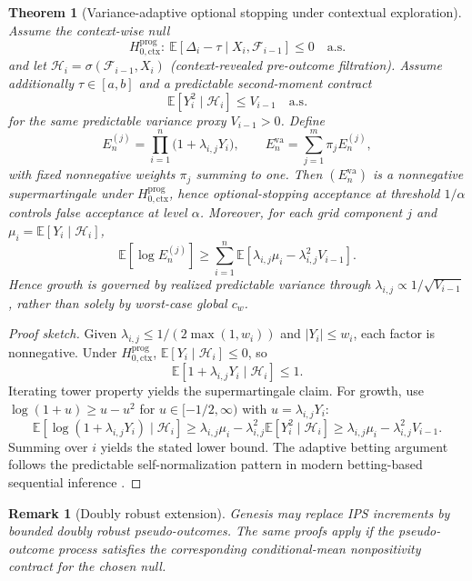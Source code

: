 \documentclass[11pt,a4paper]{article}
\newtheorem{theorem}{Theorem}[section]
\newtheorem{remark}{Remark}[section]
\begin{document}
\begin{theorem}[Variance-adaptive optional stopping under contextual exploration]
\label{thm:adaptive-var}
Assume the context-wise null
\[
H_{0,\mathrm{ctx}}^{\mathrm{prog}}:\ \mathbb{E}[\Delta_i-\tau\mid X_i,\mathcal{F}_{i-1}]\le 0\quad\text{a.s.}
\]
and let $\mathcal{H}_i=\sigma(\mathcal{F}_{i-1},X_i)$ (context-revealed pre-outcome filtration).
Assume additionally $\tau\in[a,b]$ and a predictable second-moment contract
\[
\mathbb{E}[Y_i^2\mid \mathcal{H}_i]\le V_{i-1}\quad\text{a.s.}
\]
for the same predictable variance proxy $V_{i-1}>0$.
Define
\[
E_n^{(j)}=\prod_{i=1}^{n}\bigl(1+\lambda_{i,j}Y_i\bigr),\qquad
E_n^{\mathrm{va}}=\sum_{j=1}^{m}\pi_j E_n^{(j)},
\]
with fixed nonnegative weights $\pi_j$ summing to one.
Then $(E_n^{\mathrm{va}})$ is a nonnegative supermartingale under $H_{0,\mathrm{ctx}}^{\mathrm{prog}}$, hence optional-stopping acceptance at threshold $1/\alpha$ controls false acceptance at level $\alpha$.
Moreover, for each grid component $j$ and $\mu_i=\mathbb{E}[Y_i\mid\mathcal{H}_i]$,
\[
\mathbb{E}\!\left[\log E_n^{(j)}\right]
\ge
\sum_{i=1}^{n}\mathbb{E}\!\left[\lambda_{i,j}\mu_i-\lambda_{i,j}^2V_{i-1}\right].
\]
Hence growth is governed by realized predictable variance through $\lambda_{i,j}\propto 1/\sqrt{V_{i-1}}$, rather than solely by worst-case global $c_w$.
\end{theorem}
\begin{proof}[Proof sketch]
Given $\lambda_{i,j}\le 1/(2\max(1,w_i))$ and $|Y_i|\le w_i$, each factor is nonnegative.
Under $H_{0,\mathrm{ctx}}^{\mathrm{prog}}$, $\mathbb{E}[Y_i\mid\mathcal{H}_i]\le0$, so
\[
\mathbb{E}[1+\lambda_{i,j}Y_i\mid\mathcal{H}_i]\le 1.
\]
Iterating tower property yields the supermartingale claim.
For growth, use $\log(1+u)\ge u-u^2$ for $u\in[-1/2,\infty)$ with $u=\lambda_{i,j}Y_i$:
\[
\mathbb{E}[\log(1+\lambda_{i,j}Y_i)\mid\mathcal{H}_i]
\ge
\lambda_{i,j}\mu_i-\lambda_{i,j}^2\mathbb{E}[Y_i^2\mid\mathcal{H}_i]
\ge
\lambda_{i,j}\mu_i-\lambda_{i,j}^2V_{i-1}.
\]
Summing over $i$ yields the stated lower bound.
The adaptive betting argument follows the predictable self-normalization pattern in modern betting-based sequential inference \citep{WaudbySmithRamdas2024Betting}.
\end{proof}

\begin{remark}[Doubly robust extension]
Genesis may replace IPS increments by bounded doubly robust pseudo-outcomes.
The same proofs apply if the pseudo-outcome process satisfies the corresponding conditional-mean nonpositivity contract for the chosen null.
\end{remark}
\end{document}
